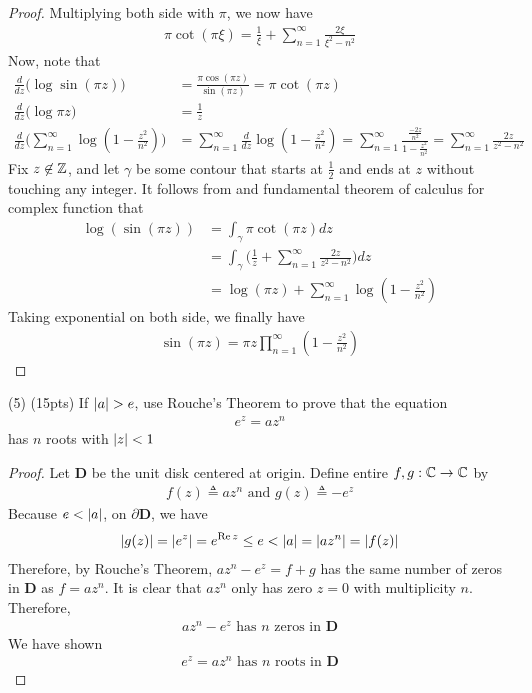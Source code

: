 \documentclass{report}
\begin{document}
\begin{proof}
Multiplying both side with $\pi $, we now have 
\begin{align}
\label{kk}
\pi  \cot (\pi  \xi)= \frac{1}{\xi}+ \sum_{n=1}^{\infty} \frac{2\xi}{\xi^2-n^2}
\end{align}
Now, note that 
\begin{align*}
\frac{d}{dz} \Big(\log \sin (\pi  z) \Big)&= \frac{\pi  \cos (\pi  z)}{\sin (\pi  z)}= \pi  \cot (\pi  z) \\
\frac{d}{dz} \Big( \log \pi  z \Big)&=\frac{1}{z} \\
\frac{d}{dz} \Big( \sum_{n=1}^{\infty} \log (1- \frac{z^2}{n^2}) \Big)&= \sum_{n=1}^{\infty} \frac{d}{dz} \log ( 1- \frac{z^2}{n^2}) = \sum_{n=1}^{\infty} \frac{\frac{-2z}{n^2}}{1- \frac{z^2}{n^2}}= \sum_{n=1}^{\infty} \frac{2z}{z^2-n^2}
\end{align*}
Fix $z\not\in\mathbb{Z}$, and let $\gamma $ be some contour that starts at $\frac{1}{2}$ and ends at $z$ without touching any integer. It follows from  and fundamental theorem of calculus for complex function that 
\begin{align*}
\log (\sin (\pi z))&=\int_{\gamma } \pi  \cot (\pi  z)dz \\
&= \int_{\gamma }\Big( \frac{1}{z}+ \sum_{n=1}^{\infty} \frac{2z}{z^2-n^2} \Big) dz \\
&=\log (\pi  z)+ \sum_{n=1}^{\infty} \log (1-\frac{z^2}{n^2})
\end{align*}
Taking exponential on both side, we finally have 
\begin{align*}
\sin (\pi  z)= \pi  z \prod_{n=1}^{\infty} (1-\frac{z^2}{n^2})
\end{align*}
\end{proof}
\begin{question}{}{}
  (5) (15pts) If $\abso{a}>e$, use Rouche's Theorem to prove that the equation 
\begin{align*}
e^z= az^n  
\end{align*}
has $n$ roots with $\left|z\right|<1$
\end{question}
\begin{proof}
Let $\textbf{D}$ be the unit disk centered at origin. Define entire $f,g:\mathbb{C}\rightarrow \mathbb{C}$ by 
\begin{align*}
f(z)\triangleq  az^n  \text{ and }g(z)\triangleq -e^z
\end{align*}
Because $e< \left|a\right|$, on $\partial \textbf{D}$, we have 
\begin{align*}
\left|g(z)\right|= \left|e^z\right|=e^{\operatorname{Re}z} \leq e < \left|a\right|= \left|az^n\right|=\left|f(z)\right|
\end{align*}
Therefore, by Rouche's Theorem,  $az^n-e^z=f+g$ has the same number of zeros in $\textbf{D}$ as  $f=az^n$. It is clear that $az^n$ only has zero $z=0$ with multiplicity $n$. Therefore, 
\begin{align*}
az^n-e^z\text{ has }n\text{ zeros in }\textbf{D}
\end{align*}
We have shown 
\begin{align*}
e^z=az^n\text{ has }n\text{ roots in }\textbf{D}
\end{align*}
\end{proof}
\end{document}
